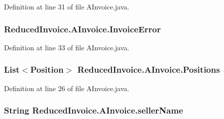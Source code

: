 Definition at line 31 of file A\+Invoice.\+java.

\subsubsection[{\texorpdfstring{Invoice\+Error}{InvoiceError}}]{ Reduced\+Invoice.\+A\+Invoice.\+Invoice\+Error\hspace{0.3cm}{\ttfamily [protected]}}\hypertarget{class_reduced_invoice_1_1_a_invoice_a3ef6a3a4efa7e9b652f5399bc76e017a}{}\label{class_reduced_invoice_1_1_a_invoice_a3ef6a3a4efa7e9b652f5399bc76e017a}


Definition at line 33 of file A\+Invoice.\+java.

\subsubsection[{\texorpdfstring{Positions}{Positions}}]{\setlength{\rightskip}{0pt plus 5cm}List$<${\bf Position}$>$ Reduced\+Invoice.\+A\+Invoice.\+Positions\hspace{0.3cm}{\ttfamily [protected]}}\hypertarget{class_reduced_invoice_1_1_a_invoice_a5b51f1865386bd021580507c7133f69a}{}\label{class_reduced_invoice_1_1_a_invoice_a5b51f1865386bd021580507c7133f69a}


Definition at line 26 of file A\+Invoice.\+java.

\subsubsection[{\texorpdfstring{seller\+Name}{sellerName}}]{\setlength{\rightskip}{0pt plus 5cm}String Reduced\+Invoice.\+A\+Invoice.\+seller\+Name\hspace{0.3cm}{\ttfamily [protected]}}\hypertarget{class_reduced_invoice_1_1_a_invoice_ae00a97e1c74841fe0b0b43fccd1da24d}{}\label{class_reduced_invoice_1_1_a_invoice_ae00a97e1c74841fe0b0b43fccd1da24d}


